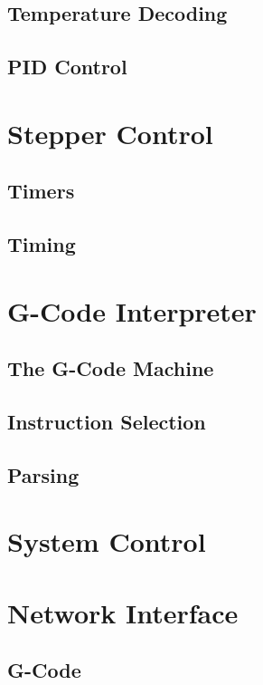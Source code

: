 		\subsection{Temperature Decoding}
		
		\subsection{PID Control}
	
	\section{Stepper Control}
		
		\subsection{Timers}
		
		\subsection{Timing}
	
	\section{G-Code Interpreter}
		
		\subsection{The G-Code Machine}
		
		\subsection{Instruction Selection}
		
		\subsection{Parsing}
	
	\section{System Control}
	
	\section{Network Interface}
		
		\subsection{G-Code}
		
